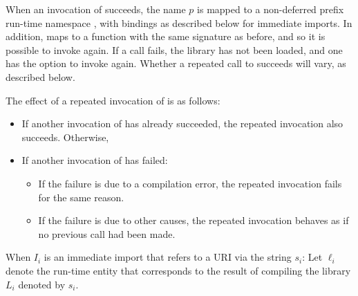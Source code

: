 \documentclass[makeidx]{article}
\begin{document}
{

\LMHash{}%
When an invocation of  succeeds,
the name $p$ is mapped to a non-deferred prefix run-time namespace
,
with bindings as described below for immediate imports.
In addition, 
maps  to a function with the same signature as before,
and so it is possible to invoke  again.
If a call fails, the library has not been loaded,
and one has the option to invoke  again.
Whether a repeated call to  succeeds will vary,
as described below.


\LMHash{}%
The effect of a repeated invocation of  is as follows:
\begin{itemize}
\item
  If another invocation of  has already succeeded,
  the repeated invocation also succeeds.
  Otherwise,
\item
  If another invocation of  has failed:
  \begin{itemize}
  \item
    If the failure is due to a compilation error,
    the repeated invocation fails for the same reason.
  \item
    If the failure is due to other causes,
    the repeated invocation behaves as if no previous call had been made.
  \end{itemize}
\end{itemize}

\EndCase

\LMHash{}%
When $I_i$ is an immediate import that refers to a URI via the string $s_i$:
Let $\ell_i$ denote the run-time entity that corresponds to the result of
compiling the library $L_i$ denoted by $s_i$.

}
\end{document}
